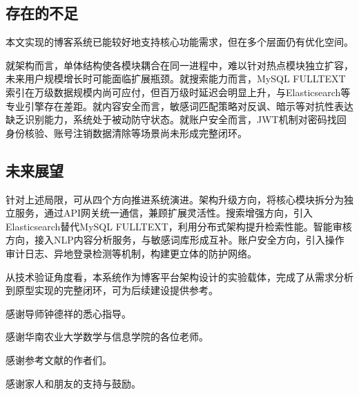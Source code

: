\documentclass[UTF8,AutoFakeBold=1,AutoFakeSlant,zihao=-4]{SCAU}
\begin{document}
\subsection{存在的不足}

本文实现的博客系统已能较好地支持核心功能需求，但在多个层面仍有优化空间。

就架构而言，单体结构使各模块耦合在同一进程中，难以针对热点模块独立扩容，未来用户规模增长时可能面临扩展瓶颈。就搜索能力而言，MySQL FULLTEXT索引在万级数据规模内尚可应付，但百万级时延迟会明显上升，与Elasticsearch等专业引擎存在差距。就内容安全而言，敏感词匹配策略对反讽、暗示等对抗性表达缺乏识别能力，系统处于被动防守状态。就账户安全而言，JWT机制对密码找回身份核验、账号注销数据清除等场景尚未形成完整闭环。

\subsection{未来展望}

针对上述局限，可从四个方向推进系统演进。架构升级方向，将核心模块拆分为独立服务，通过API网关统一通信，兼顾扩展灵活性{\citep{Lyu2025}}。搜索增强方向，引入Elasticsearch替代MySQL FULLTEXT，利用分布式架构提升检索性能。智能审核方向，接入NLP内容分析服务，与敏感词库形成互补{\citep{颉浪鑫2023}}。账户安全方向，引入操作审计日志、异地登录检测等机制，构建更立体的防护网络。

从技术验证角度看，本系统作为博客平台架构设计的实验载体，完成了从需求分析到原型实现的完整闭环，可为后续建设提供参考。


 \clearpage{} %

 \nocite{*}      %


\acknowledgement

感谢导师钟德祥的悉心指导。

感谢华南农业大学数学与信息学院的各位老师。

感谢参考文献的作者们。

感谢家人和朋友的支持与鼓励。

\end{document}
